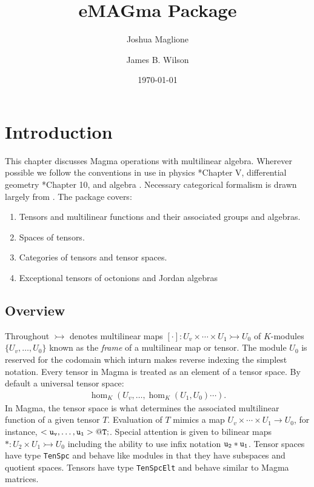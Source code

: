 \documentclass{documentation}
\title{eMAGma Package}
\author{Joshua Maglione}
\author{James B. Wilson}
\date{\today}
\begin{document}
\frontmatter

\dominitoc
\maketitle
\tableofcontents

\mainmatter

\chapter{Introduction}

This chapter discusses Magma operations with multilinear algebra.
Wherever possible we follow the conventions in use in physics 
\cite{Weyl}*{Chapter V}, differential geometry 
\cite{Lee:geom}*{Chapter 10}, and algebra \cite{Landsberg:tensors}.
Necessary categorical formalism is drawn largely from
\cite{Wilson:division}.  The package covers:
\begin{enumerate}
\item Tensors and multilinear functions and their associated groups and algebras.
\item Spaces of tensors.
\item Categories of tensors and tensor spaces.
\item Exceptional tensors of octonions and Jordan algebras
\end{enumerate}

\section{Overview}
Throughout $\rightarrowtail$ denotes multilinear maps 
$[\cdot]:U_v\times \cdots \times U_1\rightarrowtail U_0$ of
$K$-modules $\{U_v,\dots,U_0\}$ known as the {\em frame} of a 
multilinear map or tensor.  
The module $U_0$ is reserved for the codomain which inturn makes
reverse indexing the simplest notation.
Every tensor in Magma is treated as an element of a tensor space.
By default a universal tensor space:
\begin{align*}
	\hom_K(U_v,\dots,\hom_K(U_1,U_0)\cdots).
\end{align*} 
In Magma, the tensor space is what determines the associated
multilinear function of a given tensor $T$.  
Evaluation of $T$ mimics a map
$U_v\times \cdots \times U_1\to U_0$, for instance, ${\tt	< u_v,\dots,u_1> @ T;}$.
Special attention is given to bilinear maps 
$*:U_2\times U_1\rightarrowtail U_0$
including the ability to use infix notation ${\tt u_2*u_1}$.
Tensor spaces have type {\tt TenSpc} and behave like modules 
in that they have subspaces and quotient spaces.  Tensors have type 
{\tt TenSpcElt} and behave similar to Magma matrices.
\end{document}
